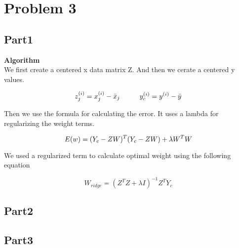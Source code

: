 \section{Problem 3}

\subsection{Part1}

{\bfseries Algorithm} \\
We first create a centered x data matrix Z. And then we cerate a centered y values.

\begin{equation}
z^{(i)}_{j} = x^{(i)}_{j} - \bar{x}_{j} \hspace{10 mm} 
y^{(i)}_{c} = y^{(i)} - \bar{y} \\
\end{equation}

Then we use the formula for calculating the error. It uses a lambda for regularizing the
weight terms. 

\begin{equation}
  E(w)= (Y_{c} - ZW)^T(Y_{c}-ZW) + \lambda W^TW \\
\end{equation}

We used a regularized term to calculate optimal weight using the following equation

\begin{equation}
  W_{ridge} = (Z^{T}Z + \lambda I)^{-1}Z^{T}Y_{c}
\end{equation}


\subsection{Part2}

\subsection{Part3}
